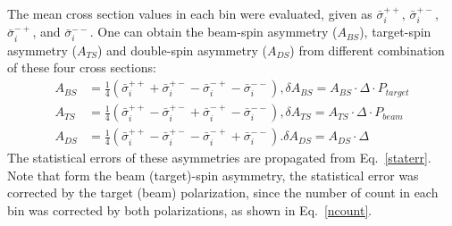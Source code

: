 \documentclass[a4paper,10.5pt]{article}
\begin{document}
 The mean cross section values in each bin were evaluated, given as $\bar{\sigma}_{i}^{++}$, $\bar{\sigma}_{i}^{+-}$, $\bar{\sigma}_{i}^{-+}$, and $\bar{\sigma}_{i}^{--}$. One can obtain the beam-spin asymmetry ($A_{BS}$), target-spin asymmetry ($A_{TS}$) and double-spin asymmetry ($A_{DS}$) from different combination of these four cross sections:
   \begin{equation}
     \begin{align*}
        A_{BS} &= \frac{1}{4}(\bar{\sigma}_{i}^{++} + \bar{\sigma}_{i}^{+-} - \bar{\sigma}_{i}^{-+} - \bar{\sigma}_{i}^{--}), \delta A_{BS} = A_{BS}\cdot \Delta \cdot P_{target}\\
        A_{TS} &= \frac{1}{4}(\bar{\sigma}_{i}^{++} - \bar{\sigma}_{i}^{+-} + \bar{\sigma}_{i}^{-+} - \bar{\sigma}_{i}^{--}), \delta A_{TS} = A_{TS}\cdot\Delta \cdot P_{beam}\\   
        A_{DS} &= \frac{1}{4}(\bar{\sigma}_{i}^{++} - \bar{\sigma}_{i}^{+-} - \bar{\sigma}_{i}^{-+} + \bar{\sigma}_{i}^{--}). \delta A_{DS} = A_{DS}\cdot\Delta 
     \end{align*}
   \end{equation}
The statistical errors of these asymmetries are propagated from Eq.~\ref{staterr}. Note that form the beam (target)-spin asymmetry, the statistical error was corrected by the target (beam) polarization, since the number of count in each bin was corrected by both polarizations, as shown in Eq.~\ref{ncount}.
\end{document}
